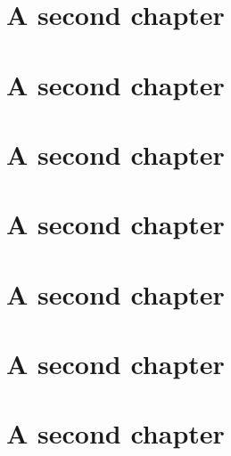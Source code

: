 \documentclass{memoir}
\begin{document}
\chapter{A second chapter}
\chapter{A second chapter}
\chapter{A second chapter}
\chapter{A second chapter}
\chapter{A second chapter}
\chapter{A second chapter}
\chapter{A second chapter}

\backmatter
\end{document}
